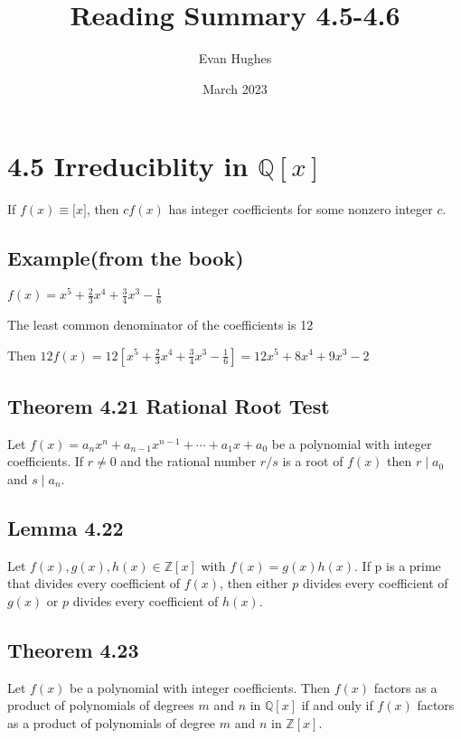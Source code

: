 \documentclass{article}
\title{Reading Summary 4.5-4.6}
\author{Evan Hughes}
\date{March 2023}
\begin{document}
\maketitle
\section*{4.5 Irreduciblity in $\mathbb{Q}[x]$}

If $f(x) \equiv \mathbb[x]$, then $cf(x)$ has integer coefficients for some nonzero integer $c$.

\subsection*{Example(from the book)}
$f(x) = x^5 + \frac{2}{3}x^4 + \frac{3}{4}x^3 - \frac{1}{6}$

The least common denominator of the coefficients is 12

Then $12f(x) = 12[x^5 + \frac{2}{3}x^4 + \frac{3}{4}x^3 - \frac{1}{6}] = 12x^5 + 8x^4 + 9x^3 -2$

\subsection*{Theorem 4.21 Rational Root Test}

Let $f(x) = a_nx^n + a_{n-1}x^{n-1} + \cdots + a_1x + a_0$ be a polynomial with integer coefficients. 
If $r\neq 0$ and the rational number $r/s$ is a root of $f(x)$ then $r\mid a_0$ and $s\mid a_n$.

\subsection*{Lemma 4.22}
Let $f(x),g(x),h(x) \in \mathbb{Z}[x]$ with $f(x) = g(x)h(x)$. If p is a prime that divides every coefficient of $f(x)$, then either
$p$ divides every coefficient of $g(x)$ or $p$ divides every coefficient of $h(x)$.

\subsection*{Theorem 4.23}
Let $f(x)$ be a polynomial with integer coefficients. Then $f(x)$ factors as 
a product of polynomials of degrees $m$ and $n$ in $\mathbb{Q}[x]$ if and only if $f(x)$ factors as a product
of polynomials of degree $m$ and $n$ in $\mathbb{Z}[x]$.
\end{document}
